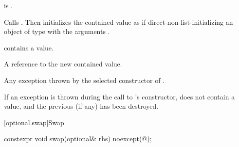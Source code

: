 \begin{itemdescr}
\pnum
\constraints
{} is .

\pnum
\effects
Calls . Then initializes the contained value as if direct-non-list-initializing an object of type  with the arguments .

\pnum
\ensures
{} contains a value.

\pnum
\returns
A reference to the new contained value.

\pnum
\throws
Any exception thrown by the selected constructor of .

\pnum
\remarks
If an exception is thrown during the call to 's constructor,  does not contain a value, and the previous  (if any) has been destroyed.
\end{itemdescr}

[optional.swap]{Swap}

%
\begin{itemdecl}
constexpr void swap(optional& rhs) noexcept(@\seebelow@);
\end{itemdecl}

